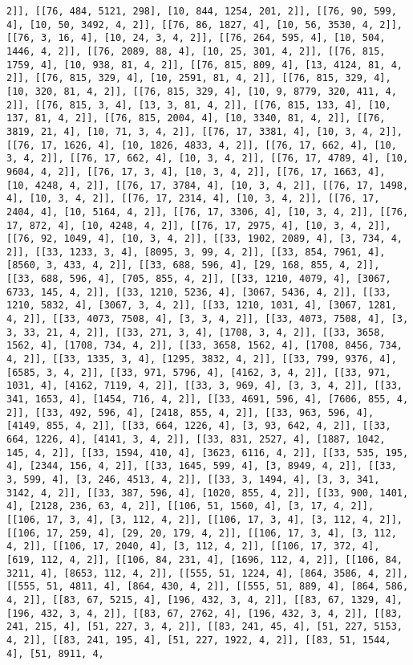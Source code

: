 \documentclass[12pt,fleqn]{article}\usepackage{../../common}
\begin{document}
\begin{verbatim}
2]], [[76, 484, 5121, 298], [10, 844, 1254, 201, 2]], [[76, 90, 599, 4], [10, 50, 3492, 4, 2]], [[76, 86, 1827, 4], [10, 56, 3530, 4, 2]], [[76, 3, 16, 4], [10, 24, 3, 4, 2]], [[76, 264, 595, 4], [10, 504, 1446, 4, 2]], [[76, 2089, 88, 4], [10, 25, 301, 4, 2]], [[76, 815, 1759, 4], [10, 938, 81, 4, 2]], [[76, 815, 809, 4], [13, 4124, 81, 4, 2]], [[76, 815, 329, 4], [10, 2591, 81, 4, 2]], [[76, 815, 329, 4], [10, 320, 81, 4, 2]], [[76, 815, 329, 4], [10, 9, 8779, 320, 411, 4, 2]], [[76, 815, 3, 4], [13, 3, 81, 4, 2]], [[76, 815, 133, 4], [10, 137, 81, 4, 2]], [[76, 815, 2004, 4], [10, 3340, 81, 4, 2]], [[76, 3819, 21, 4], [10, 71, 3, 4, 2]], [[76, 17, 3381, 4], [10, 3, 4, 2]], [[76, 17, 1626, 4], [10, 1826, 4833, 4, 2]], [[76, 17, 662, 4], [10, 3, 4, 2]], [[76, 17, 662, 4], [10, 3, 4, 2]], [[76, 17, 4789, 4], [10, 9604, 4, 2]], [[76, 17, 3, 4], [10, 3, 4, 2]], [[76, 17, 1663, 4], [10, 4248, 4, 2]], [[76, 17, 3784, 4], [10, 3, 4, 2]], [[76, 17, 1498, 4], [10, 3, 4, 2]], [[76, 17, 2314, 4], [10, 3, 4, 2]], [[76, 17, 2404, 4], [10, 5164, 4, 2]], [[76, 17, 3306, 4], [10, 3, 4, 2]], [[76, 17, 872, 4], [10, 4248, 4, 2]], [[76, 17, 2975, 4], [10, 3, 4, 2]], [[76, 92, 1049, 4], [10, 3, 4, 2]], [[33, 1902, 2089, 4], [3, 734, 4, 2]], [[33, 1233, 3, 4], [8095, 3, 99, 4, 2]], [[33, 854, 7961, 4], [8560, 3, 433, 4, 2]], [[33, 688, 596, 4], [29, 168, 855, 4, 2]], [[33, 688, 596, 4], [705, 855, 4, 2]], [[33, 1210, 4079, 4], [3067, 6733, 145, 4, 2]], [[33, 1210, 5236, 4], [3067, 5436, 4, 2]], [[33, 1210, 5832, 4], [3067, 3, 4, 2]], [[33, 1210, 1031, 4], [3067, 1281, 4, 2]], [[33, 4073, 7508, 4], [3, 3, 4, 2]], [[33, 4073, 7508, 4], [3, 3, 33, 21, 4, 2]], [[33, 271, 3, 4], [1708, 3, 4, 2]], [[33, 3658, 1562, 4], [1708, 734, 4, 2]], [[33, 3658, 1562, 4], [1708, 8456, 734, 4, 2]], [[33, 1335, 3, 4], [1295, 3832, 4, 2]], [[33, 799, 9376, 4], [6585, 3, 4, 2]], [[33, 971, 5796, 4], [4162, 3, 4, 2]], [[33, 971, 1031, 4], [4162, 7119, 4, 2]], [[33, 3, 969, 4], [3, 3, 4, 2]], [[33, 341, 1653, 4], [1454, 716, 4, 2]], [[33, 4691, 596, 4], [7606, 855, 4, 2]], [[33, 492, 596, 4], [2418, 855, 4, 2]], [[33, 963, 596, 4], [4149, 855, 4, 2]], [[33, 664, 1226, 4], [3, 93, 642, 4, 2]], [[33, 664, 1226, 4], [4141, 3, 4, 2]], [[33, 831, 2527, 4], [1887, 1042, 145, 4, 2]], [[33, 1594, 410, 4], [3623, 6116, 4, 2]], [[33, 535, 195, 4], [2344, 156, 4, 2]], [[33, 1645, 599, 4], [3, 8949, 4, 2]], [[33, 3, 599, 4], [3, 246, 4513, 4, 2]], [[33, 3, 1494, 4], [3, 3, 341, 3142, 4, 2]], [[33, 387, 596, 4], [1020, 855, 4, 2]], [[33, 900, 1401, 4], [2128, 236, 63, 4, 2]], [[106, 51, 1560, 4], [3, 17, 4, 2]], [[106, 17, 3, 4], [3, 112, 4, 2]], [[106, 17, 3, 4], [3, 112, 4, 2]], [[106, 17, 259, 4], [29, 20, 179, 4, 2]], [[106, 17, 3, 4], [3, 112, 4, 2]], [[106, 17, 2040, 4], [3, 112, 4, 2]], [[106, 17, 372, 4], [619, 112, 4, 2]], [[106, 84, 231, 4], [1696, 112, 4, 2]], [[106, 84, 3211, 4], [8653, 112, 4, 2]], [[555, 51, 1224, 4], [864, 3586, 4, 2]], [[555, 51, 4811, 4], [864, 430, 4, 2]], [[555, 51, 889, 4], [864, 586, 4, 2]], [[83, 67, 5215, 4], [196, 432, 3, 4, 2]], [[83, 67, 1329, 4], [196, 432, 3, 4, 2]], [[83, 67, 2762, 4], [196, 432, 3, 4, 2]], [[83, 241, 215, 4], [51, 227, 3, 4, 2]], [[83, 241, 45, 4], [51, 227, 5153, 4, 2]], [[83, 241, 195, 4], [51, 227, 1922, 4, 2]], [[83, 51, 1544, 4], [51, 8911, 4, 
\end{verbatim}
\end{document}
